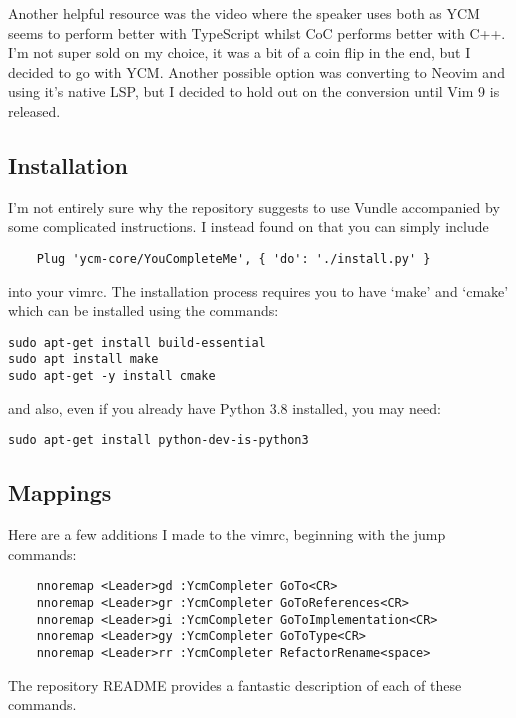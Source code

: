 Another helpful resource was the video \cite{primeagen2020cocvsycm} where the
speaker uses both as YCM seems to perform better with TypeScript whilst CoC
performs better with C++. I'm not super sold on my choice, it was a bit of a
coin flip in the end, but I decided to go with YCM. Another possible option was
converting to Neovim and using it's native LSP, but I decided to hold out on the
conversion until Vim 9 is released.

\subsection{Installation}
I'm not entirely sure why the repository \cite{ycmcore2017ycm} suggests to use
Vundle accompanied by some complicated instructions. I instead found on
\cite{yves2020why} that you can simply include
\begin{lstlisting}
    Plug 'ycm-core/YouCompleteMe', { 'do': './install.py' }
\end{lstlisting}
into your vimrc. The installation process requires you to have `make' and
`cmake' which can be installed using the commands:
\begin{lstlisting}
sudo apt-get install build-essential
sudo apt install make
sudo apt-get -y install cmake
\end{lstlisting}
and also, even if you already have Python 3.8 installed, you may need:
\begin{lstlisting}
sudo apt-get install python-dev-is-python3
\end{lstlisting}

\subsection{Mappings}
Here are a few additions I made to the vimrc, beginning with the jump commands:
\begin{lstlisting}
    nnoremap <Leader>gd :YcmCompleter GoTo<CR>
    nnoremap <Leader>gr :YcmCompleter GoToReferences<CR>
    nnoremap <Leader>gi :YcmCompleter GoToImplementation<CR>
    nnoremap <Leader>gy :YcmCompleter GoToType<CR>
    nnoremap <Leader>rr :YcmCompleter RefactorRename<space>
\end{lstlisting}
The repository README provides a fantastic description of each of these
commands.\\

